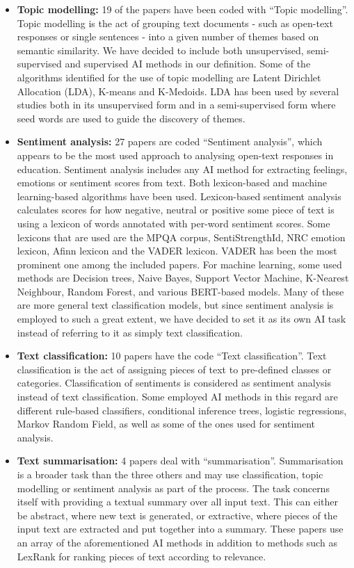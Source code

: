 \begin{itemize}
    \item \textbf{Topic modelling:}
    19 of the papers have been coded with ``Topic modelling''. Topic modelling is the act of grouping text documents - such as open-text responses or single sentences - into a given number of themes based on semantic similarity. We have decided to include both unsupervised, semi-supervised and supervised AI methods in our definition. Some of the algorithms identified for the use of topic modelling are Latent Dirichlet Allocation (LDA), K-means and K-Medoids. LDA has been used by several studies both in its unsupervised form and in a semi-supervised form where seed words are used to guide the discovery of themes.
    \item \textbf{Sentiment analysis:}
    27 papers are coded ``Sentiment analysis'', which appears to be the most used approach to analysing open-text responses in education. Sentiment analysis includes any AI method for extracting feelings, emotions or sentiment scores from text. Both lexicon-based and machine learning-based algorithms have been used. Lexicon-based sentiment analysis calculates scores for how negative, neutral or positive some piece of text is using a lexicon of words annotated with per-word sentiment scores. Some lexicons that are used are the MPQA corpus, SentiStrengthId, NRC emotion lexicon, Afinn lexicon and the VADER lexicon. VADER has been the most prominent one among the included papers. For machine learning, some used methods are Decision trees, Naive Bayes, Support Vector Machine, K-Nearest Neighbour, Random Forest, and various BERT-based models. Many of these are more general text classification models, but since sentiment analysis is employed to such a great extent, we have decided to set it as its own AI task instead of referring to it as simply text classification.
    \item \textbf{Text classification:}
    10 papers have the code ``Text classification''. Text classification is the act of assigning pieces of text to pre-defined classes or categories. Classification of sentiments is considered as sentiment analysis instead of text classification. Some employed AI methods in this regard are different rule-based classifiers, conditional inference trees, logistic regressions, Markov Random Field, as well as some of the ones used for sentiment analysis.
    \item \textbf{Text summarisation:}
    4 papers deal with ``summarisation''. Summarisation is a broader task than the three others and may use classification, topic modelling or sentiment analysis as part of the process. The task concerns itself with providing a textual summary over all input text. This can either be abstract, where new text is generated, or extractive, where pieces of the input text are extracted and put together into a summary. These papers use an array of the aforementioned AI methods in addition to methods such as LexRank for ranking pieces of text according to relevance.
\end{itemize}

